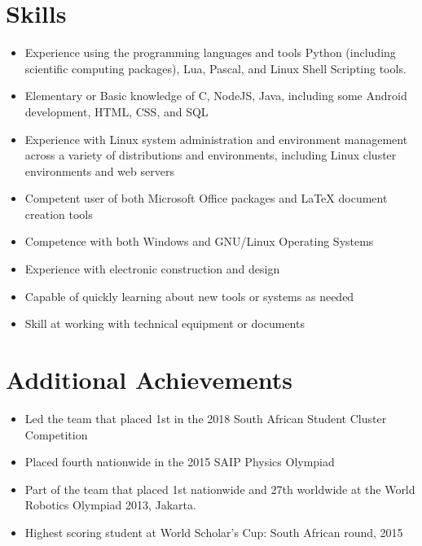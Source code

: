 \documentclass[12pt,a4paper,notitlepage]{article}
\begin{document}
\section*{Skills}
\begin{itemize}
    \item Experience using the programming languages and tools Python (including scientific computing packages), Lua, Pascal, and Linux Shell Scripting tools.
    \item Elementary or Basic knowledge of C, NodeJS, Java, including some Android development, HTML, CSS, and SQL
    \item Experience with Linux system administration and environment management across a variety of distributions and environments, including Linux cluster environments and web servers
    \item Competent user of both Microsoft Office packages and LaTeX document creation tools
    \item Competence with both Windows and GNU/Linux Operating Systems
    \item Experience with electronic construction and design
    \item Capable of quickly learning about new tools or systems as needed
    \item Skill at working with technical equipment or documents
\end{itemize}

\section*{Additional Achievements}
\begin{itemize}
    \item Led the team that placed 1st in the 2018 South African Student Cluster Competition
    \item Placed fourth nationwide in the 2015 SAIP Physics Olympiad
    \item Part of the team that placed 1st nationwide and 27th worldwide at the World Robotics Olympiad 2013, Jakarta.
    \item Highest scoring student at World Scholar's Cup: South African round, 2015
\end{itemize}
\end{document}
